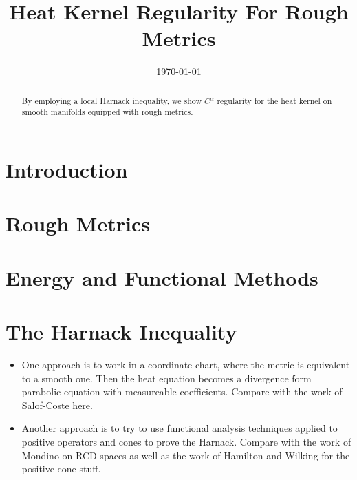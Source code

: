 \documentclass{amsart}
\begin{document}
\title[Heat Kernel Regularity]
 {Heat Kernel Regularity For Rough Metrics}

\curraddr{}
\email{}
\date{\today}

\dedicatory{}
\subjclass[2010]{}
\keywords{}

\begin{abstract}
By employing a local Harnack inequality, we show $C^{\alpha}$ regularity for the heat kernel on smooth manifolds equipped with rough metrics. 
\end{abstract}

\maketitle

\section{Introduction}
\label{sec:intro}

\section{Rough Metrics}
\label{sec:rough_metrics}

\section{Energy and Functional Methods}
\label{eq:energy}

\section{The Harnack Inequality}
\label{sec:harnack}

\begin{itemize}
\item One approach is to work in a coordinate chart, where the metric is equivalent to a smooth one. Then the heat equation becomes a divergence form parabolic equation with measureable coefficients. Compare with the work of Salof-Coste here.
\item Another approach is to try to use functional analysis techniques applied to positive operators and cones to prove the Harnack. Compare with the work of Mondino on RCD spaces as well as the work of Hamilton and Wilking for the positive cone stuff.
\end{itemize}
\end{document}
